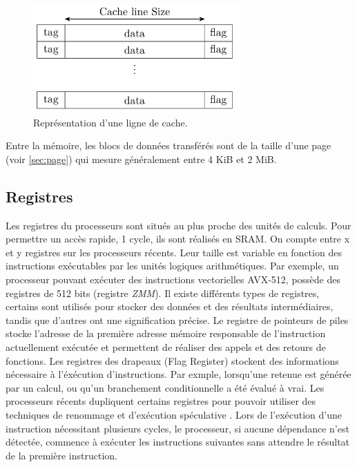 \begin{figure}
    \center
    \includegraphics[width=8cm]{images/cacheline_def.png}
    \caption{\label{pic:cacheline} Représentation d'une ligne de cache.}
\end{figure}


Entre la mémoire, les blocs de données transférés sont de la taille d'une page (voir \autoref{sec:page}) qui mesure généralement entre 4 KiB et 2 MiB.



\subsection{Registres}
Les registres du processeurs sont situés au plus proche des unités de calculs. Pour permettre un accès rapide, 1 cycle, ils sont réalisés en SRAM. On compte entre x et y registres sur les processeurs récents. Leur taille est variable en fonction des instructions exécutables par les unités logiques arithmétiques. Par exemple, un processeur pouvant exécuter des instructions vectorielles AVX-512, possède des registres de 512 bits (registre \textit{ZMM}). Il existe différents types de registres, certains sont utilisés pour stocker des données et des résultats intermédiaires, tandis que d’autres ont une signification précise. Le registre de pointeurs de piles stocke l’adresse de la première adresse mémoire responsable de l’instruction actuellement exécutée et permettent de réaliser des appels et des retours de fonctions. Les registres des drapeaux (Flag Register) stockent des informations nécessaire à l’éxécution d’instructions. Par exmple, lorsqu’une retenue est générée par un calcul, ou qu’un branchement conditionnelle a été évalué à vrai. Les processeurs récents dupliquent certains registres pour pouvoir utiliser des techniques de renommage \cite{moudgill1993register} et d'exécution spéculative \cite{chou2004efficient}. Lors de l'exécution d'une instruction nécessitant plusieurs cycles, le processeur, si aucune dépendance n'est détectée, commence à exécuter les instructions suivantes sans attendre le résultat de la première instruction.






